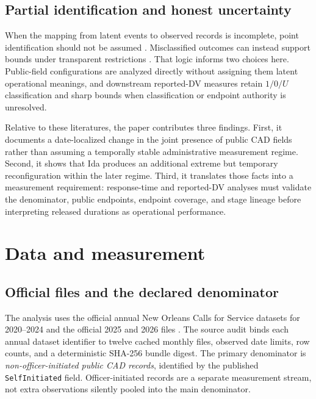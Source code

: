 \documentclass[11pt]{article}
\begin{document}
\subsection{Partial identification and honest uncertainty}

When the mapping from latent events to observed records is incomplete, point identification should not be assumed \citep{Manski1989,Manski1990,Manski2003,Tamer2010,Molinari2020}. Misclassified outcomes can instead support bounds under transparent restrictions \citep{HorowitzManski1995,Molinari2008}. That logic informs two choices here. Public-field configurations are analyzed directly without assigning them latent operational meanings, and downstream reported-DV measures retain $1/0/U$ classification and sharp bounds when classification or endpoint authority is unresolved.

Relative to these literatures, the paper contributes three findings. First, it documents a date-localized change in the joint presence of public CAD fields rather than assuming a temporally stable administrative measurement regime. Second, it shows that Ida produces an additional extreme but temporary reconfiguration within the later regime. Third, it translates those facts into a measurement requirement: response-time and reported-DV analyses must validate the denominator, public endpoints, endpoint coverage, and stage lineage before interpreting released durations as operational performance.

\section{Data and measurement}

\subsection{Official files and the declared denominator}

The analysis uses the official annual New Orleans Calls for Service datasets for 2020--2024 and the official 2025 and 2026 files \citep{DataNOLA2020,DataNOLA2021,DataNOLA2022,DataNOLA2023,DataNOLA2024,DataNOLA2025,DataNOLA2026}. The source audit binds each annual dataset identifier to twelve cached monthly files, observed date limits, row counts, and a deterministic SHA-256 bundle digest. The primary denominator is \emph{non-officer-initiated public CAD records}, identified by the published \texttt{SelfInitiated} field. Officer-initiated records are a separate measurement stream, not extra observations silently pooled into the main denominator.
\end{document}

